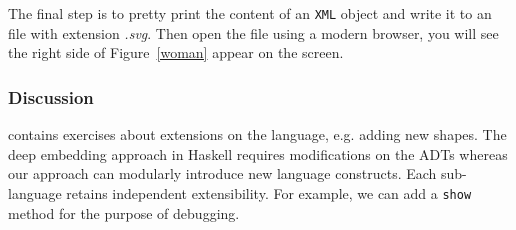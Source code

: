 The final step is to pretty print the content of an \texttt{XML} object and
write it to an file with extension
\emph{.svg}.
Then open the file using a modern browser, you will see the right side of
Figure~\ref{woman} appear on the screen.

\subsubsection{Discussion}
\cite{} contains exercises about extensions on the language, e.g.
adding new shapes. The deep embedding approach in Haskell requires modifications on the ADTs
whereas our approach can modularly introduce new language constructs.
Each sub-language retains independent extensibility.
For example, we can add a \texttt{show} method for the purpose of debugging.
